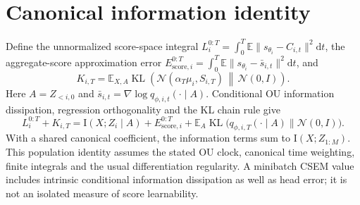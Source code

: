 \documentclass[10pt]{article}
\newcommand{\E}{\mathbb E}
\newcommand{\KL}{\operatorname{KL}}
\newcommand{\N}{\mathcal N}
\newcommand{\II}{\mathrm I}
\newcommand{\dd}{\mathrm d}
\newcommand{\Score}[1]{E_{\mathrm{score},#1}}
\begin{document}
\section{Canonical information identity}
Define the unnormalized score-space integral $L_i^{0:T}=\int_0^T\E\|s_{\theta_i}-C_{i,t}\|^2\dd t$, the aggregate-score approximation error $\Score{i}^{0:T}=\int_0^T\E\|s_{\theta_i}-\bar s_{i,t}\|^2\dd t$, and
\begin{equation}
K_{i,T}=\E_{X,A}\KL\!\left(\N(\alpha_T\mu_i,S_{i,T})\,\middle\|\,\N(0,I)\right).
\end{equation}
Here $A=Z_{<i,0}$ and $\bar s_{i,t}=\nabla\log q_{\phi,i,t}(\cdot\mid A)$. Conditional OU information dissipation, regression orthogonality and the KL chain rule give
\begin{equation}
\boxed{L_i^{0:T}+K_{i,T}=\II(X;Z_i\mid A)+\Score{i}^{0:T}
+\E_A\KL\bigl(q_{\phi,i,T}(\cdot\mid A)\|\N(0,I)\bigr).}
\label{eq:identity}
\end{equation}
With a shared canonical coefficient, the information terms sum to $\II(X;Z_{1:M})$. This population identity assumes the stated OU clock, canonical time weighting, finite integrals and the usual differentiation regularity. A minibatch CSEM value includes intrinsic conditional information dissipation as well as head error; it is not an isolated measure of score learnability.

\medskip
\end{document}
